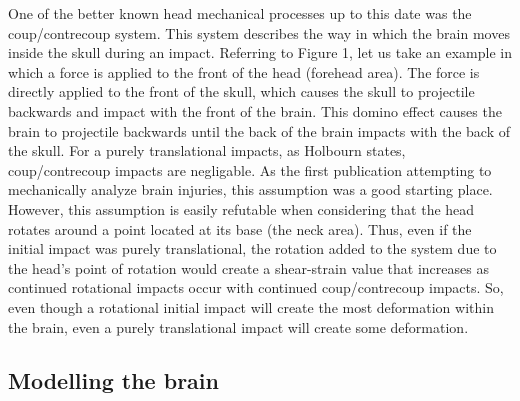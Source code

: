 \documentclass[%
 aip,
 amsmath,amssymb,
 reprint,%
 floatfix,%
]{revtex4-1}
\begin{document}
One of the better known head mechanical processes up to this date was the coup/contrecoup system. This system describes the way in which the brain moves inside the skull during an impact. Referring to Figure 1, let us take an example in which a force is applied to the front of the head (forehead area). The force is directly applied to the front of the skull, which causes the skull to projectile backwards and impact with the front of the brain. This domino effect causes the brain to projectile backwards until the back of the brain impacts with the back of the skull. For a purely translational impacts, as Holbourn states, coup/contrecoup impacts are negligable. As the first publication attempting to mechanically analyze brain injuries, this assumption was a good starting place. However, this assumption is easily refutable when considering that the head rotates around a point located at its base (the neck area). Thus, even if the initial impact was purely translational, the rotation added to the system due to the head's point of rotation would create a shear-strain value that increases as continued rotational impacts occur with continued coup/contrecoup impacts. So, even though a rotational initial impact will create the most deformation within the brain, even a purely translational impact will create some deformation.

\subsection{Modelling the brain}
\end{document}
